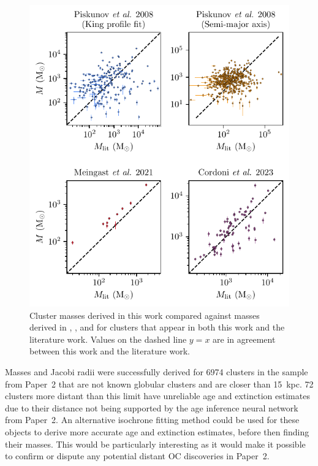 \begin{figure}[p]
    \centering
    \includegraphics[width=\textwidth]{fig/c4/results_mass_comparison.pdf}
    \caption[Cluster masses derived in this work compared against masses derived in literature works.]{Cluster masses derived in this work compared against masses derived in \cite{piskunov_tidal_2008}, \cite{meingast_extended_2021}, and \cite{cordoni_photometric_binaries_2023} for clusters that appear in both this work and the literature work. Values on the dashed line $y=x$ are in agreement between this work and the literature work.}
    \label{fig:dynamics:results:mass_comparison}
\end{figure}

Masses and Jacobi radii were successfully derived for 6974 clusters in the sample from Paper~2 that are not known globular clusters and are closer than 15~kpc. 72 clusters more distant than this limit have unreliable age and extinction estimates due to their distance not being supported by the age inference neural network from Paper~2. An alternative isochrone fitting method could be used for these objects to derive more accurate age and extinction estimates, before then finding their masses. This would be particularly interesting as it would make it possible to confirm or dispute any potential distant OC discoveries in Paper~2.

